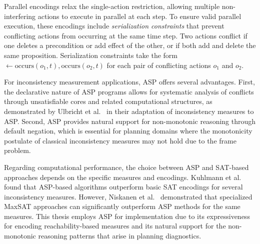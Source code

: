 Parallel encodings relax the single-action restriction, allowing multiple non-inter\-fering actions to execute in parallel at each step. To ensure valid parallel execution, these encodings include \emph{serialization constraints} that prevent conflicting actions from occurring at the same time step. Two actions conflict if one deletes a precondition or add effect of the other, or if both add and delete the same proposition. Serialization constraints take the form $\leftarrow \text{occurs}(o_1, t), \text{occurs}(o_2, t)$ for each pair of conflicting actions $o_1$ and $o_2$.

For inconsistency measurement applications, \ac{ASP} offers several advantages. First, the declarative nature of \ac{ASP} programs allows for systematic analysis of conflicts through unsatisfiable cores and related computational structures, as demonstrated by Ulbricht et al.~\cite{Ulbricht2016} in their adaptation of inconsistency measures to \ac{ASP}. Second, \ac{ASP} provides natural support for non-monotonic reasoning through default negation, which is essential for planning domains where the monotonicity postulate of classical inconsistency measures may not hold due to the frame problem.

Regarding computational performance, the choice between \ac{ASP} and \ac{SAT}-based approaches depends on the specific measures and encodings. Kuhlmann et al.~\cite{Kuhlmann2025} found that \ac{ASP}-based algorithms outperform basic \ac{SAT} encodings for several inconsistency measures. However, Niskanen et al.~\cite{Niskanen2023} demonstrated that specialized MaxSAT approaches can significantly outperform \ac{ASP} methods for the same measures. This thesis employs \ac{ASP} for implementation due to its expressiveness for encoding reachability-based measures and its natural support for the non-monotonic reasoning patterns that arise in planning diagnostics.
